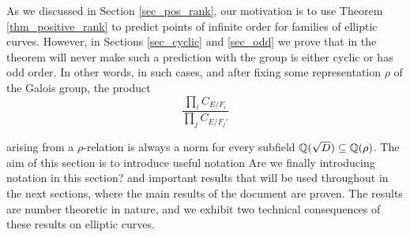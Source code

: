As we discussed in Section \ref{sec_pos_rank}, our motivation is to use Theorem \ref*{thm_positive_rank} to predict points of infinite order for families of elliptic curves. However, in Sections \ref{sec_cyclic} and \ref{sec_odd} we prove that in the theorem will never make such a prediction with the group is either cyclic or has odd order. In other words, in such cases, and after fixing some representation $\rho$ of the Galois group, the product
\begin{equation}\label{eqn_localprod}
    \frac{\prod_i C_{E/F_i}}{\prod_j C_{E/F_j'}}
\end{equation}

arising from a $\rho$-relation is always a norm for every subfield $\mathbb{Q}(\sqrt{D})\subseteq\mathbb{Q}(\rho)$. The aim of this section is to introduce useful notation {\color{red} Are we finally introducing notation in this section?} and important results that will be used throughout in the next sections, where the main results of the document are proven. The results are number theoretic in nature, and we exhibit two technical consequences of these results on elliptic curves.





